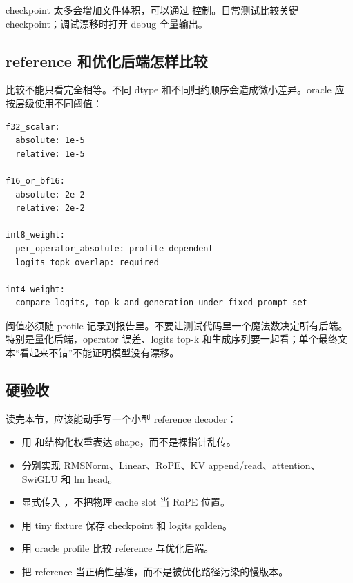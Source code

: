 checkpoint 太多会增加文件体积，可以通过  控制。日常测试比较关键 checkpoint；调试漂移时打开 debug 全量输出。

\subsection{reference 和优化后端怎样比较}

比较不能只看完全相等。不同 dtype 和不同归约顺序会造成微小差异。oracle 应按层级使用不同阈值：

\begin{lstlisting}[numbers=none,caption={oracle tolerance profile}]
f32_scalar:
  absolute: 1e-5
  relative: 1e-5

f16_or_bf16:
  absolute: 2e-2
  relative: 2e-2

int8_weight:
  per_operator_absolute: profile dependent
  logits_topk_overlap: required

int4_weight:
  compare logits, top-k and generation under fixed prompt set
\end{lstlisting}

阈值必须随 profile 记录到报告里。不要让测试代码里一个魔法数决定所有后端。特别是量化后端，operator 误差、logits top-k 和生成序列要一起看；单个最终文本“看起来不错”不能证明模型没有漂移。

\subsection{硬验收}

读完本节，应该能动手写一个小型 reference decoder：

\begin{itemize}
  \item 用  和结构化权重表达 shape，而不是裸指针乱传。
  \item 分别实现 RMSNorm、Linear、RoPE、KV append/read、attention、SwiGLU 和 lm head。
  \item 显式传入 ，不把物理 cache slot 当 RoPE 位置。
  \item 用 tiny fixture 保存 checkpoint 和 logits golden。
  \item 用 oracle profile 比较 reference 与优化后端。
  \item 把 reference 当正确性基准，而不是被优化路径污染的慢版本。
\end{itemize}
